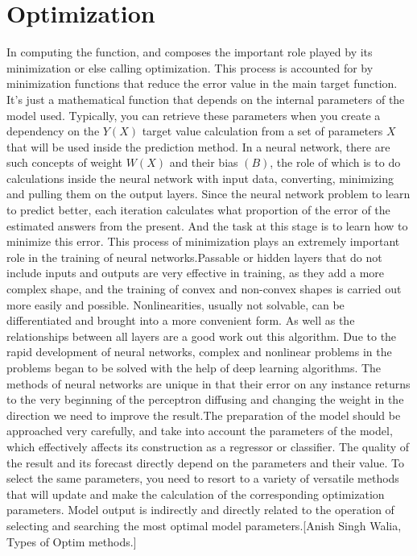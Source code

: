 \section{Optimization}\label{sec:3.6}
\vspace{-0.5cm}
\noindent In computing the function, and composes the important role played by its minimization or else calling optimization. This process is accounted for by minimization functions that reduce the error value in the main target function. It's just a mathematical function that depends on the internal parameters of the model used. Typically, you can retrieve these parameters when you create a dependency on the $Y(X)$ target value calculation from a set of parameters $X$ that will be used inside the prediction method. In a neural network, there are such concepts of weight $W(X)$ and their bias $(B)$, the role of which is to do calculations inside the neural network with input data, converting, minimizing and pulling them on the output layers. Since the neural network problem to learn to predict better, each iteration calculates what proportion of the error of the estimated answers from the present. And the task at this stage is to learn how to minimize this error. This process of minimization plays an extremely important role in the training of neural networks.Passable or hidden layers that do not include inputs and outputs are very effective in training, as they add a more complex shape, and the training of convex and non-convex shapes is carried out more easily and possible. Nonlinearities, usually not solvable, can be differentiated and brought into a more convenient form. As well as the relationships between all layers are a good work out this algorithm. Due to the rapid development of neural networks, complex and nonlinear problems in the problems began to be solved with the help of deep learning algorithms. The methods of neural networks are unique in that their error on any instance returns to the very beginning of the perceptron diffusing and changing the weight in the direction we need to improve the result.The preparation of the model should be approached very carefully, and take into account the parameters of the model, which effectively affects its construction as a regressor or classifier. The quality of the result and its forecast directly depend on the parameters and their value. To select the same parameters, you need to resort to a variety of versatile methods that will update and make the calculation of the corresponding optimization parameters. Model output is indirectly and directly related to the operation of selecting and searching the most optimal model parameters.[Anish Singh Walia, Types of Optim methods.]

